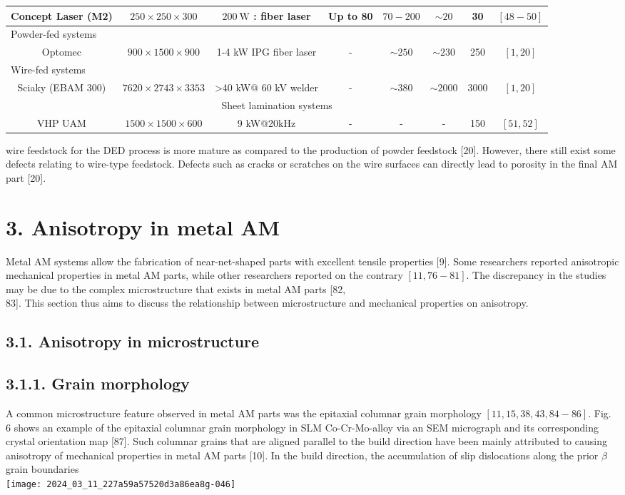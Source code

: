\documentclass[10pt]{article}
\begin{document}
\begin{center}
\begin{tabular}{|c|c|c|c|c|c|c|c|}
\hline
Concept Laser (M2) & $250 \times 250 \times 300$ & $200 \mathrm{~W}$ : fiber laser & Up to 80 & $70-200$ & $\sim 20$ & 30 & $[48-50]$ \\
\hline
\multicolumn{8}{|l|}{Powder-fed systems} \\
\hline
Optomec & $900 \times 1500 \times 900$ & 1-4 kW IPG fiber laser & - & $\sim 250$ & $\sim 230$ & 250 & $[1,20]$ \\
\hline
\multicolumn{8}{|l|}{Wire-fed systems} \\
\hline
Sciaky (EBAM 300) & $7620 \times 2743 \times 3353$ & >40 kW@ 60 kV welder & - & $\sim 380$ & $\sim 2000$ & 3000 & $[1,20]$ \\
\hline
\multicolumn{8}{|c|}{Sheet lamination systems} \\
\hline
VHP UAM & $1500 \times 1500 \times 600$ & 9 kW@20kHz & - & - & - & 150 & $[51,52]$ \\
\hline
\end{tabular}
\end{center}

wire feedstock for the DED process is more mature as compared to the production of powder feedstock [20]. However, there still exist some defects relating to wire-type feedstock. Defects such as cracks or scratches on the wire surfaces can directly lead to porosity in the final AM part [20].

\section*{3. Anisotropy in metal AM}
Metal AM systems allow the fabrication of near-net-shaped parts with excellent tensile properties [9]. Some researchers reported anisotropic mechanical properties in metal AM parts, while other researchers reported on the contrary $[11,76-81]$. The discrepancy in the studies may be due to the complex microstructure that exists in metal AM parts [82,\\
83]. This section thus aims to discuss the relationship between microstructure and mechanical properties on anisotropy.

\subsection*{3.1. Anisotropy in microstructure}
\subsection*{3.1.1. Grain morphology}
A common microstructure feature observed in metal AM parts was the epitaxial columnar grain morphology $[11,15,38,43,84-86]$. Fig. 6 shows an example of the epitaxial columnar grain morphology in SLM Co-Cr-Mo-alloy via an SEM micrograph and its corresponding crystal orientation map [87]. Such columnar grains that are aligned parallel to the build direction have been mainly attributed to causing anisotropy of mechanical properties in metal AM parts [10]. In the build direction, the accumulation of slip dislocations along the prior $\beta$ grain boundaries\\
\texttt{[image: 2024\_03\_11\_227a59a57520d3a86ea8g-046]}
\end{document}
